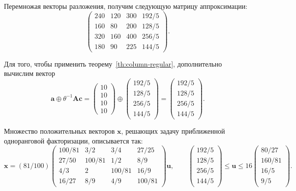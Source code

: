 \documentclass[specialist,
               substylefile = spbu.rtx,
               subf,href,colorlinks=true, 12pt]{disser}
\theoremstyle{definition}
\begin{document}
Перемножая векторы разложения, получим следующую матрицу аппроксимации: 
\begin{equation*}
\begin{pmatrix}
240 &120 &300 &192/5\\
160 &80 &200 &128/5\\
320 &160 &400 &256/5\\
180 &90 &225 &144/5
\end{pmatrix}.
\end{equation*}
  
Для того, чтобы применить теорему~\ref{th:column-regular}, дополнительно вычислим вектор
\begin{equation*}
\bm{a}
\oplus
\theta^{-1}\bm{A}\bm{c}
=
\begin{pmatrix}
10\\10\\10\\10
\end{pmatrix}
\oplus
\begin{pmatrix}
192/5\\128/5\\256/5\\144/5
\end{pmatrix}
=
\begin{pmatrix}
192/5\\128/5\\256/5\\144/5
\end{pmatrix}.
\end{equation*}

Множество положительных векторов $\bm{x}$, решающих задачу приближенной одноранговой факторизации, описывается так:
\begin{equation*}%
\bm{x}
=
(81/100)
\begin{pmatrix}
100/81 & 3/2 &3/4 &27/25\\
27/50 &100/81 &1/2 &8/9\\
4/3 &2 &100/81 &16/9\\
16/27 &8/9 &4/9 &100/81
\end{pmatrix}
\bm{u},
\qquad
\begin{pmatrix}
192/5\\128/5\\256/5\\144/5
\end{pmatrix}
\leq
\bm{u}
\leq
16
\begin{pmatrix}
80/27\\
160/81\\16/5\\9/5
\end{pmatrix}.
\end{equation*}
\end{document}
